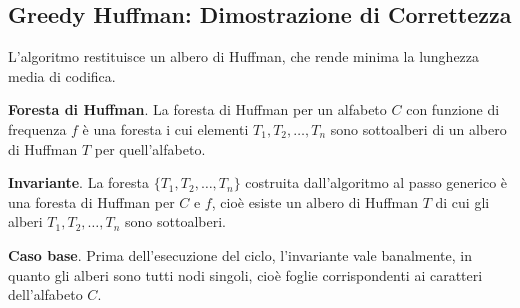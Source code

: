 \documentclass[11pt]{article}
\begin{document}
\subsection*{Greedy Huffman: Dimostrazione di Correttezza}
L'algoritmo restituisce un albero di Huffman, che rende minima la lunghezza media di codifica.

\textbf{Foresta di Huffman}. La foresta di Huffman per un alfabeto $C$ con funzione di frequenza $f$ è una foresta i 
cui elementi $T_1,T_2,\dots,T_n$ sono sottoalberi di un albero di Huffman $T$ per quell'alfabeto.

\textbf{Invariante}. La foresta $\{T_1,T_2,\dots,T_n\}$ costruita dall'algoritmo al passo generico è una foresta di 
Huffman per $C$ e $f$, cioè esiste un albero di Huffman $T$ di cui gli alberi $T_1,T_2,\dots,T_n$ sono sottoalberi.

\textbf{Caso base}. Prima dell'esecuzione del ciclo, l'invariante vale banalmente, in quanto gli alberi sono tutti 
nodi singoli, cioè foglie corrispondenti ai caratteri dell'alfabeto $C$.
\end{document}
